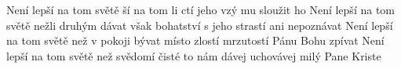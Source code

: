 \begin{TEXT}{Není lepší na tom světě}
\SLOKA {} ší na tom  li  ctí \NL
jeho vzý mu sloužit ho  
\SLOKA Není lepší na tom světě nežli druhým dávat \NL
však bohatství s jeho strastí ani nepoznávat 
\SLOKA Není lepší na tom světě než v pokoji bývat \NL
místo zlostí mrzutostí Pánu Bohu zpívat 
\SLOKA Není lepší na tom \NL
světě než svědomí čisté \NL
to nám dávej uchovávej milý Pane Kriste \NL
\end{TEXT}
